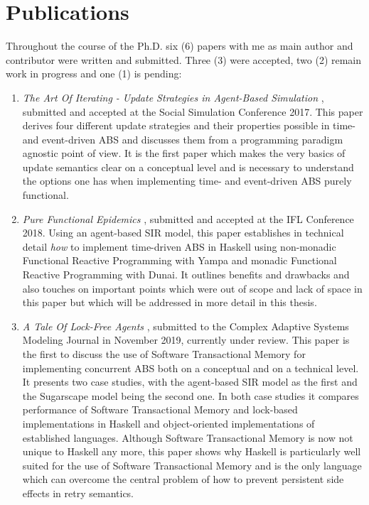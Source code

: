 \section*{Publications}
Throughout the course of the Ph.D. six (6) papers with me as main author and contributor were written and submitted. Three (3) were accepted, two (2) remain work in progress and one (1) is pending:

\begin{enumerate}
	\item \textit{The Art Of Iterating - Update Strategies in Agent-Based Simulation} \cite{thaler_art_2017, payne_social_2019}, submitted and accepted at the Social Simulation Conference 2017. This paper derives four different update strategies and their properties possible in time- and event-driven ABS and discusses them from a programming paradigm agnostic point of view. It is the first paper which makes the very basics of update semantics clear on a conceptual level and is necessary to understand the options one has when implementing time- and event-driven ABS purely functional.
	
	\item \textit{Pure Functional Epidemics} \cite{thaler_pure_2018}, submitted and accepted at the IFL Conference 2018. Using an agent-based SIR model, this paper establishes in technical detail \textit{how} to implement time-driven ABS in Haskell using non-monadic Functional Reactive Programming with Yampa and monadic Functional Reactive Programming with Dunai. It outlines benefits and drawbacks and also touches on important points which were out of scope and lack of space in this paper but which will be addressed in more detail in this thesis.
	
	\item \textit{A Tale Of Lock-Free Agents} \cite{thaler_tale_2018}, submitted to the Complex Adaptive Systems Modeling Journal in November 2019, currently under review. This paper is the first to discuss the use of Software Transactional Memory for implementing concurrent ABS both on a conceptual and on a technical level. It presents two case studies, with the agent-based SIR model as the first and the Sugarscape model being the second one. In both case studies it compares performance of Software Transactional Memory and lock-based implementations in Haskell and object-oriented implementations of established languages. Although Software Transactional Memory is now not unique to Haskell any more, this paper shows why Haskell is particularly well suited for the use of Software Transactional Memory and is the only language which can overcome the central problem of how to prevent persistent side effects in retry semantics.


\end{enumerate}
